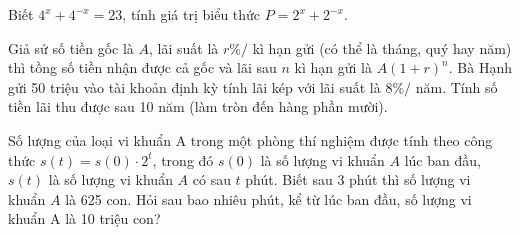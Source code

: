 \begin{ex}%
	Biết $4^x+4^{-x}=23$, tính giá trị biểu thức $ P=2^x+2^{-x}$.
\end{ex}

\begin{ex}%
	Giả sử số tiền gốc là $ A$, lãi suất là $ r\% /$ kì hạn gửi (có thể là tháng, quý hay năm) thì tồng số tiền nhận được cả gốc và lãi sau $ n$ kì hạn gửi là $ A{(1+r)^n}$. Bà Hạnh gửi 50 triệu vào tài khoản định kỳ tính lãi kép với lãi suất là $ 8\% /$ năm. Tính số tiền lãi thu được sau 10 năm (làm tròn đến hàng phần mười).
\end{ex}

\begin{ex}%
	Số lượng của loại vi khuẩn A trong một phòng thí nghiệm được tính theo công thức $ s(t)=s(0)\cdot{2^t}$, trong đó $ s(0)$ là số lượng vi khuẩn $ A$ lúc ban đầu, $ s(t)$ là số lượng vi khuẩn $ A$ có sau $ t$ phút. Biết sau 3 phút thì số lượng vi khuẩn $ A$ là 625 con. Hỏi sau bao nhiêu phút, kể từ lúc ban đầu, số lượng vi khuẩn A là 10 triệu con?\\
\end{ex}

